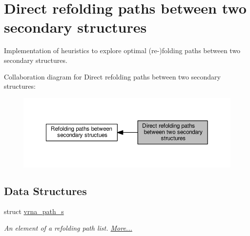 \hypertarget{group__direct__paths}{}\section{Direct refolding paths between two secondary structures}
\label{group__direct__paths}


Implementation of heuristics to explore optimal (re-\/)folding paths between two secondary structures.  


Collaboration diagram for Direct refolding paths between two secondary structures\+:
\nopagebreak
\begin{figure}[H]
\begin{center}
\leavevmode
\includegraphics[width=350pt]{group__direct__paths}
\end{center}
\end{figure}
\subsection*{Data Structures}
\begin{DoxyCompactItemize}
\item 
struct \hyperlink{group__direct__paths_structvrna__path__s}{vrna\+\_\+path\+\_\+s}
\begin{DoxyCompactList}\small\item\em An element of a refolding path list.  \hyperlink{group__direct__paths_structvrna__path__s}{More...}\end{DoxyCompactList}\end{DoxyCompactItemize}
